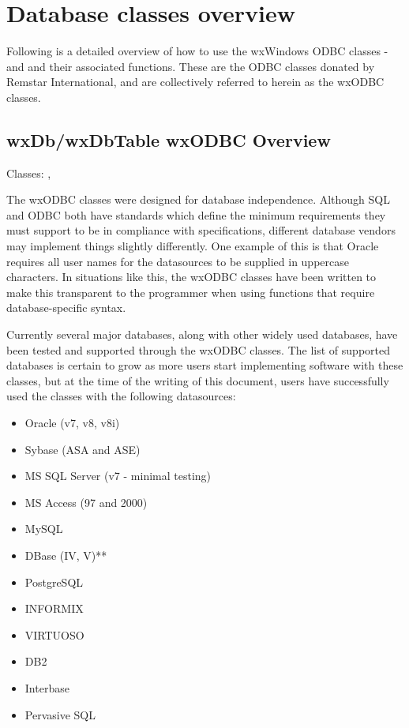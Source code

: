 \section{Database classes overview}\label{odbcoverview}

Following is a detailed overview of how to use the wxWindows ODBC classes -  
and  and their associated functions. These are 
the ODBC classes donated by Remstar International, and are collectively 
referred to herein as the wxODBC classes.

\subsection{wxDb/wxDbTable wxODBC Overview}\label{wxodbcoverview}

Classes: , 

The wxODBC classes were designed for database independence. Although SQL and 
ODBC both have standards which define the minimum requirements they must 
support to be in compliance with specifications, different database vendors 
may implement things slightly differently. One example of this is that Oracle 
requires all user names for the datasources to be supplied in uppercase 
characters. In situations like this, the wxODBC classes have been written 
to make this transparent to the programmer when using functions that require 
database-specific syntax.

Currently several major databases, along with other widely used databases, 
have been tested and supported through the wxODBC classes. The list of 
supported databases is certain to grow as more users start implementing 
software with these classes, but at the time of the writing of this document, 
users have successfully used the classes with the following datasources:

\begin{itemize}\itemsep=0pt
\item Oracle (v7, v8, v8i)
\item Sybase (ASA and ASE)
\item MS SQL Server (v7 - minimal testing)
\item MS Access (97 and 2000)
\item MySQL
\item DBase (IV, V)**
\item PostgreSQL
\item INFORMIX
\item VIRTUOSO
\item DB2
\item Interbase
\item Pervasive SQL
\end{itemize}

